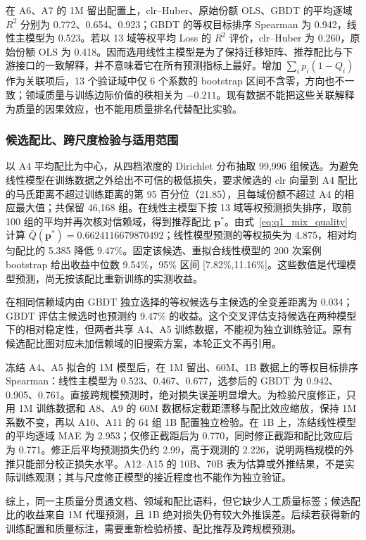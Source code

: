在 A6、A7 的 1M 留出配置上，clr--Huber、原始份额 OLS、GBDT 的平均逐域 $R^2$ 分别为 0.772、0.654、0.923；GBDT 的等权目标排序 Spearman 为 0.942，线性主模型为 0.523。若以 13 域等权平均 Loss 的 $R^2$ 评价，clr--Huber 为 0.260，原始份额 OLS 为 0.418。因而选用线性主模型是为了保持迁移矩阵、推荐配比与下游接口的一致解释，并不意味着它在所有预测指标上最好。增加 $\sum_i p_i(1-Q_i)$ 作为关联项后，13 个验证域中仅 6 个系数的 bootstrap 区间不含零，方向也不一致；领域质量与训练边际价值的秩相关为 $-0.211$。现有数据不能把这些关联解释为质量的因果效应，也不能用质量排名代替配比实验。

\subsubsection{候选配比、跨尺度检验与适用范围}
以 A4 平均配比为中心，从四档浓度的 Dirichlet 分布抽取 99{,}996 组候选。为避免线性模型在训练数据之外给出不可信的极低损失，要求候选的 clr 向量到 A4 配比的马氏距离不超过训练距离的第 95 百分位（21.85），且每域份额不超过 A4 的相应最大值；共保留 46{,}168 组。在线性主模型下按 13 域等权预测损失排序，取前 100 组的平均并再次核对信赖域，得到推荐配比 $\mathbf p^*$。由式~\eqref{eq:q1_mix_quality} 计算 $\bar Q(\mathbf p^*)=0.6624116679870492$；线性模型预测的等权损失为 4.875，相对均匀配比的 5.385 降低 9.47\%。固定该候选、重拟合线性模型的 200 次案例 bootstrap 给出收益中位数 9.54\%，95\% 区间 [7.82\%,11.16\%]。这些数值是代理模型预测，尚无按该配比重新训练的实测收益。

在相同信赖域内由 GBDT 独立选择的等权候选与主候选的全变差距离为 0.034；GBDT 评估主候选时也预测约 9.47\% 的收益。这个交叉评估支持候选在两种模型下的相对稳定性，但两者共享 A4、A5 训练数据，不能视为独立训练验证。原有候选配比图对应未加信赖域的旧搜索方案，本轮正文不再引用。

冻结 A4、A5 拟合的 1M 模型后，在 1M 留出、60M、1B 数据上的等权目标排序 Spearman：线性主模型为 0.523、0.467、0.677，选参后的 GBDT 为 0.942、0.905、0.761。直接跨规模预测时，绝对损失误差明显增大。为检验尺度修正，只用 1M 训练数据和 A8、A9 的 60M 数据标定截距漂移与配比效应缩放，保持 1M 系数不变，再以 A10、A11 的 64 组 1B 配置独立检验。在 1B 上，冻结线性模型的平均逐域 MAE 为 2.953；仅修正截距后为 0.770，同时修正截距和配比效应后为 0.771。修正后平均预测损失仍约 2.99，高于观测的 2.226，说明两档规模的外推只能部分校正损失水平。A12--A15 的 10B、70B 表为估算或外推结果，不是实际训练观测；其与尺度修正模型的接近程度也不能作为独立验证。

综上，同一主质量分贯通文档、领域和配比语料，但它缺少人工质量标签；候选配比的收益来自 1M 代理预测，且 1B 绝对损失仍有较大外推误差。后续若获得新的训练配置和质量标注，需要重新检验桥接、配比推荐及跨规模预测。

